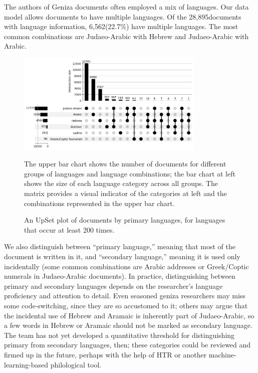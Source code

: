 \documentclass{article}
\def\documentsAnyLang{28,895}
\def\documentsMultiLang{6,562}
\def\percentDocsMultiLang{22.7\%}
\begin{document}
The authors of Geniza documents often employed a mix of languages. Our data model allows documents to have multiple languages. Of the \documentsAnyLang documents with language information, \documentsMultiLang (\percentDocsMultiLang) have multiple languages. The most common combinations are Judaeo-Arabic with Hebrew and Judaeo-Arabic with Arabic. 

\begin{figure}[!hbt]
  \centering
  \includegraphics[width=0.8\textwidth]{charts/primary_language_upsetplot.png}
  \caption{An UpSet plot of documents by primary languages, for languages that occur at least 200 times.}
    \medskip
    \small
    The upper bar chart shows the number of documents for different groups of languages and language combinations; the bar chart at left shows the size of each language category across all groups. The matrix provides a visual indicator of the categories at left and the combinations represented in the upper bar chart.\footnotemark
  \label{fig:lang_combination_upset_plot}
\end{figure}


We also distinguish between “primary language,” meaning that most of the document is written in it, and “secondary language,” meaning it is used only incidentally (some common combinations are Arabic addresses or Greek/Coptic numerals in Judaeo-Arabic documents). In practice, distinguishing between primary and secondary languages depends on the researcher’s language proficiency and attention to detail. Even seasoned geniza researchers may miss some code-switching, since they are so accustomed to it; others may argue that the incidental use of Hebrew and Aramaic is inherently part of Judaeo-Arabic, so a few words in Hebrew or Aramaic should not be marked as secondary language. The team has not yet developed a quantitative threshold for distinguishing primary from secondary languages, then; these categories could be reviewed and firmed up in the future, perhaps with the help of HTR or another machine-learning-based philological tool.
\end{document}
